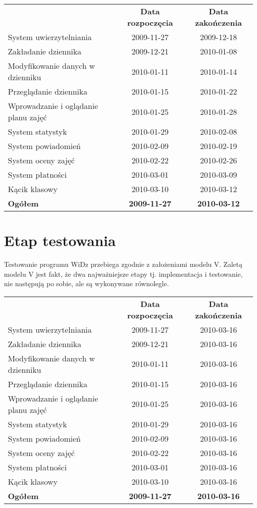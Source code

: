 \documentclass[12pt,leqno,twoside]{mwart}
\begin{document}
		\begin{tabular}{m{8cm} c c}
		
		& \textbf{Data rozpoczęcia} & \textbf{Data zakończenia} \\ 
		System uwierzytelniania & 2009-11-27 & 2009-12-18 \\ 
		Zakładanie dziennika & 2009-12-21 & 2010-01-08 \\ 
		Modyfikowanie danych w dzienniku & 2010-01-11 & 2010-01-14 \\
		Przeglądanie dziennika & 2010-01-15 & 2010-01-22 \\ 
		Wprowadzanie i oglądanie planu zajęć & 2010-01-25 & 2010-01-28 \\ 		
		System statystyk & 2010-01-29 & 2010-02-08 \\ 
		System powiadomień & 2010-02-09 & 2010-02-19 \\ 
		System oceny zajęć & 2010-02-22 & 2010-02-26 \\ 
		System płatności & 2010-03-01 & 2010-03-09 \\ 
		Kącik klasowy & 2010-03-10 & 2010-03-12 \\		
		
		\textbf{Ogółem} & \textbf{2009-11-27} & \textbf{2010-03-12} \\ 
		\end{tabular}

\section{Etap testowania}

\noindent Testowanie programu WiDz przebiega zgodnie z założeniami modelu V. Zaletą modelu V
jest fakt, że dwa najważniejsze etapy tj. implementacja i testowanie, nie następują po sobie,
ale są wykonywane równolegle.\\

		\begin{tabular}{m{8cm} c c}
		
		& \textbf{Data rozpoczęcia} & \textbf{Data zakończenia} \\ 
		System uwierzytelniania & 2009-11-27 & 2010-03-16 \\ 
		Zakładanie dziennika & 2009-12-21 & 2010-03-16 \\ 
		Modyfikowanie danych w dzienniku & 2010-01-11 & 2010-03-16 \\
		Przeglądanie dziennika & 2010-01-15 & 2010-03-16 \\ 
		Wprowadzanie i oglądanie planu zajęć & 2010-01-25 & 2010-03-16 \\ 		
		System statystyk & 2010-01-29 & 2010-03-16 \\ 
		System powiadomień & 2010-02-09 & 2010-03-16 \\ 
		System oceny zajęć & 2010-02-22 & 2010-03-16 \\ 
		System płatności & 2010-03-01 & 2010-03-16 \\ 
		Kącik klasowy & 2010-03-10 & 2010-03-16 \\		
		
		\textbf{Ogółem} & \textbf{2009-11-27} & \textbf{2010-03-16} \\ 
		\end{tabular}
\end{document}
